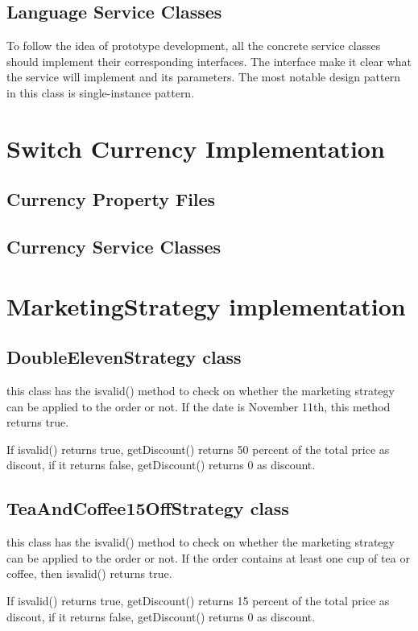 \documentclass[a4paper]{report}
\begin{document}
\subsection{Language Service Classes }
\par To follow the idea of prototype development, all the concrete service classes should implement their corresponding interfaces. The interface make it clear what the service will implement and its parameters. The most notable design pattern in this class is single-instance pattern.

\section{Switch Currency Implementation}
\subsection{Currency Property Files}
\subsection{Currency Service Classes}

\section{MarketingStrategy implementation}
\subsection{DoubleElevenStrategy class}
\par this class has the isvalid() method to check on whether the marketing strategy can be applied to the order or not.  If the date is November 11th, this method returns true.
\par If isvalid() returns true, getDiscount() returns 50 percent of the total price as discout, if it returns false, getDiscount() returns 0 as discount.
\subsection{TeaAndCoffee15OffStrategy class}
\par this class has the isvalid() method to check on whether the marketing strategy can be applied to the order or not. If the order contains at least one cup of tea or coffee, then isvalid() returns true.
\par If isvalid() returns true, getDiscount() returns 15 percent of the total price as discout, if it returns false, getDiscount() returns 0 as discount.
\end{document}
